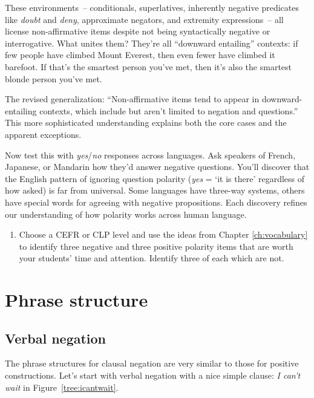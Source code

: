 These environments~-- conditionals, superlatives, inherently negative predicates like \textit{doubt} and \textit{deny}, approximate negators, and extremity expressions~-- all license non-affirmative items despite not being syntactically negative or interrogative. What unites them? They're all ``downward entailing'' contexts: if few people have climbed Mount Everest, then even fewer have climbed it barefoot. If that's the smartest person you've met, then it's also the smartest blonde person you've met.

The revised generalization: ``Non-affirmative items tend to appear in downward-entailing contexts, which include but aren't limited to negation and questions.'' This more sophisticated understanding explains both the core cases and the apparent exceptions.

Now test this with \textit{yes}/\textit{no} responses across languages. Ask speakers of French, Japanese, or Mandarin how they'd answer negative questions. You'll discover that the English pattern of ignoring question polarity (\textit{yes} = `it is there' regardless of how asked) is far from universal. Some languages have three-way systems, others have special words for agreeing with negative propositions. Each discovery refines our understanding of how polarity works across human language.


\begin{tcolorbox}[title=Appropriate polarity items, colback=white]
\begin{enumerate}[noitemsep]
    \item Choose a CEFR or CLP level and use the ideas from Chapter \ref{ch:vocabulary} to identify three negative and three positive polarity items that are worth your students' time and attention. Identify three of each which are not.
\end{enumerate}
\end{tcolorbox}

\section{Phrase structure}

\subsection{Verbal negation}

The phrase structures for clausal negation are very similar to those for positive constructions. Let's start with verbal negation with a nice simple clause: \textit{I can't wait} in Figure~\ref{tree:icantwait}.


